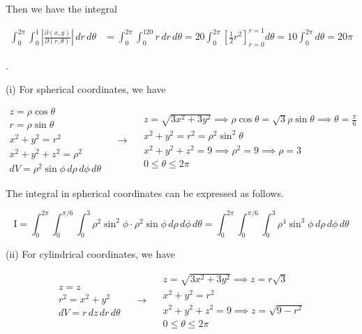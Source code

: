 \documentclass{article}
\begin{document}
\hfill

\noindent Then we have the integral

\begin{align*}\int_0^{2\pi}\int_0^1\left|\frac{\partial(x,y)}{\partial(r,\theta)}\right|\,dr\,d\theta&=\int_0^{2\pi}\int_0^120r\,dr\,d\theta=20\int_0^{2\pi}\left[\frac12r^2\right]_{r=0}^{r=1}d\theta=10\int_0^{2\pi}d\theta=\boxed{20\pi}\end{align*}

.

\hfill

\noindent (i) For spherical coordinates, we have

\[
\begin{array}{c}
z=\rho\cos\theta\\
r=\rho\sin\theta\\
x^2+y^2=r^2\\
x^2+y^2+z^2=\rho^2\\
dV=\rho^2\sin\phi\,d\rho\,d\phi\,d\theta
\end{array}\quad\rightarrow\quad
\begin{array}{c}
\displaystyle z=\sqrt{3x^2+3y^2}\implies\rho\cos\theta=\sqrt3\rho\sin\theta\implies\theta=\frac\pi6\\[0.2cm]
x^2+y^2=r^2=\rho^2\sin^2\theta\\[0.1cm]
x^2+y^2+z^2=9\implies\rho^2=9\implies\rho=3\\[0.1cm]
0\leq\theta\leq2\pi
\end{array}
\]

\hfill

\noindent The integral in spherical coordinates can be expressed as follows.

\[\boxed{\mathrm{I}=\int_0^{2\pi}\int_0^{\pi/6}\int_{0}^3\rho^2\sin^2\phi\cdot\rho^2\sin\phi\,d\rho\,d\phi\,d\theta=\int_0^{2\pi}\int_0^{\pi/6}\int_{0}^3\rho^4\sin^3\phi\,d\rho\,d\phi\,d\theta}\]

\hfill

\noindent (ii) For cylindrical coordinates, we have

\[
\begin{array}{c}
z=z\\
r^2=x^2+y^2\\
dV=r\,dz\,dr\,d\theta
\end{array}\quad\rightarrow\quad
\begin{array}{c}
z=\sqrt{3x^2+3y^2}\implies z=r\sqrt3\\[0.1cm]
x^2+y^2=r^2\\[0.1cm]
x^2+y^2+z^2=9\implies z=\sqrt{9-r^2}\\[0.1cm]
0\leq\theta\leq2\pi
\end{array}
\]
\end{document}
